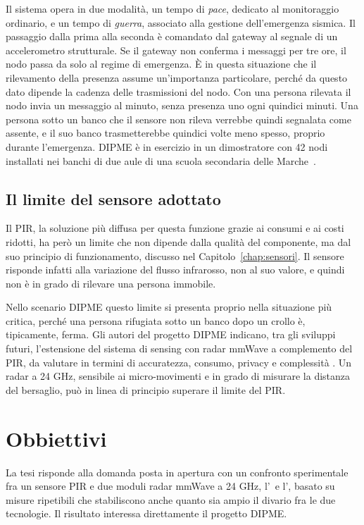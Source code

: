 Il sistema opera in due modalità, un tempo di \emph{pace}, dedicato al monitoraggio ordinario, e un tempo di \emph{guerra}, associato alla gestione dell'emergenza sismica. Il passaggio dalla prima alla seconda è comandato dal gateway al segnale di un accelerometro strutturale. Se il gateway non conferma i messaggi per tre ore, il nodo passa da solo al regime di emergenza. È in questa situazione che il rilevamento della presenza assume un'importanza particolare, perché da questo dato dipende la cadenza delle trasmissioni del nodo. Con una persona rilevata il nodo invia un messaggio al minuto, senza presenza uno ogni quindici minuti. Una persona sotto un banco che il sensore non rileva verrebbe quindi segnalata come assente, e il suo banco trasmetterebbe quindici volte meno spesso, proprio durante l'emergenza. DIPME è in esercizio in un dimostratore con 42 nodi installati nei banchi di due aule di una scuola secondaria delle Marche~\cite{callisto2026dipme}.

\subsection{Il limite del sensore adottato}
\label{sec:limite-pir}

Il PIR, la soluzione più diffusa per questa funzione grazie ai consumi e ai costi ridotti, ha però un limite che non dipende dalla qualità del componente, ma dal suo principio di funzionamento, discusso nel Capitolo~\ref{chap:sensori}. Il sensore risponde infatti alla variazione del flusso infrarosso, non al suo valore, e quindi non è in grado di rilevare una persona immobile. 

Nello scenario DIPME questo limite si presenta proprio nella situazione più critica, perché una persona rifugiata sotto un banco dopo un crollo è, tipicamente, ferma. Gli autori del progetto DIPME indicano, tra gli sviluppi futuri, l'estensione del sistema di sensing con radar mmWave a complemento del PIR, da valutare in termini di accuratezza, consumo, privacy e complessità \cite{callisto2026dipme}. Un radar a 24 GHz, sensibile ai micro-movimenti e in grado di misurare la distanza del bersaglio, può in linea di principio superare il limite del PIR.


\section{Obbiettivi}
\label{sec:obbiettivo}

La tesi risponde alla domanda posta in apertura con un confronto sperimentale fra un sensore PIR e due moduli radar mmWave a 24 GHz, l'\ldb\ e l'\ldc, basato su misure ripetibili che stabiliscono anche quanto sia ampio il divario fra le due tecnologie. Il risultato interessa direttamente il progetto DIPME.

